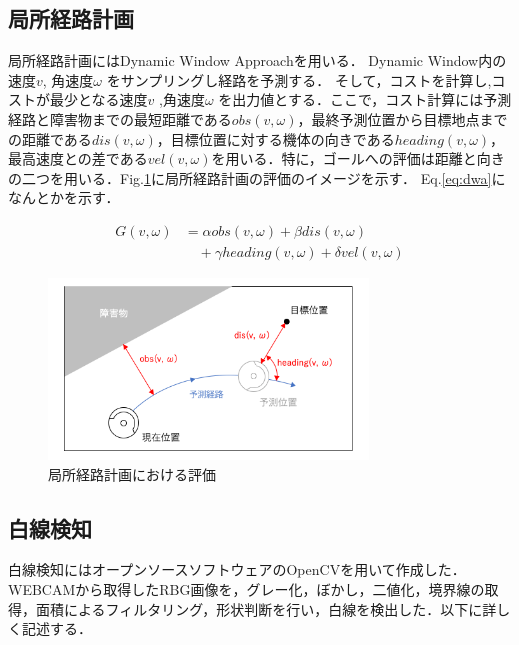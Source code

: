 \documentclass{jarticle}
\begin{document}
\subsection{局所経路計画}                                                  
局所経路計画にはDynamic Window Approachを用いる．
Dynamic Window内の速度$v$, 角速度$\omega$ をサンプリングし経路を予測する．
そして，コストを計算し,コストが最少となる速度$v$ ,角速度$\omega$ を出力値とする．ここで，コスト計算には予測経路と障害物までの最短距離である$obs(v,\omega)$，最終予測位置から目標地点までの距離である$dis(v,\omega)$，目標位置に対する機体の向きである$heading(v,\omega)$，最高速度との差である$vel(v, \omega)$を用いる．特に，ゴールへの評価は距離と向きの二つを用いる．Fig.\ref{fig:DWA}に局所経路計画の評価のイメージを示す．
Eq.\ref{eq:dwa}になんとかを示す．

\begin{equation}
	\begin{split}
		G(v, \omega) &= \alpha obs(v, \omega) + \beta dis(v, \omega)\\
		&\quad+ \gamma heading(v, \omega) + \delta vel(v, \omega) 
	    \label{eq:dwa}
	\end{split}
\end{equation}

\begin{figure}
	\includegraphics[width=8.5cm]{./picture/DWA.png}
	\caption{局所経路計画における評価}
	\label{fig:DWA}
\end{figure}

\subsection{白線検知}
白線検知にはオープンソースソフトウェアのOpenCV\cite{opencv}を用いて作成した．WEBCAMから取得したRBG画像を，グレー化，ぼかし，二値化，境界線の取得，面積によるフィルタリング，形状判断を行い，白線を検出した．以下に詳しく記述する．
\end{document}
